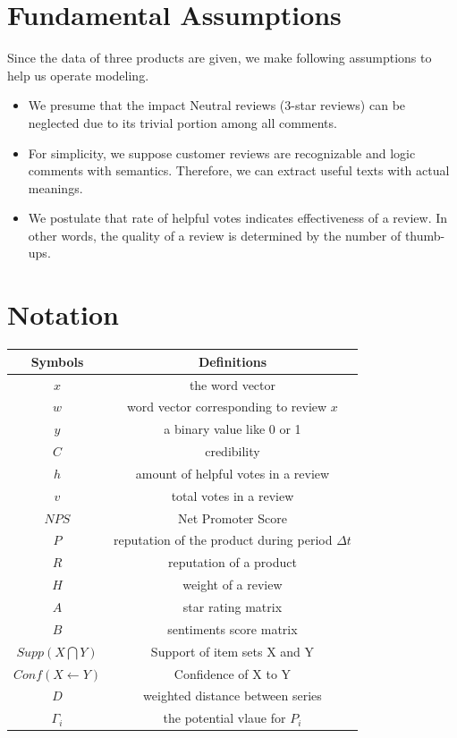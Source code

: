 \documentclass[12pt]{article}%
\begin{document}
\section{Fundamental Assumptions}
Since the data of three products are given, we make following assumptions to help us operate modeling.
\begin{itemize}
	
	\item We presume that the impact Neutral reviews (3-star reviews) can be neglected due to its trivial portion among all comments.
	\item For simplicity, we suppose customer reviews are recognizable and logic comments with semantics. Therefore, we can extract useful texts with actual meanings.
	\item We postulate that rate of helpful votes indicates effectiveness of a review. In other words, the quality of a review is determined by the number of thumb-ups.
\end{itemize}


\section{Notation}

\begin{table}[H]
	\label{biao} \centering
	\begin{tabular}{cc}
		\toprule[1.5pt]
		\multicolumn{1}{m{3cm}}{\centering Symbols} & \multicolumn{1}{m{10cm}}{\centering Definitions} \\
		\midrule[1pt]
		$x$	 &  the word vector\\
		$w$	 &  word vector corresponding to review $x$\\
		$y$	 &  a binary value like 0 or 1\\
		$C$	 &  credibility\\
		$h$	 &  amount of helpful votes in a review\\
		$v$	 &  total votes in a review\\
		$NPS$	 &  Net Promoter Score\\
		$P$	 &  reputation of the product during period $\Delta t$\\
		$R$	 &  reputation of a product\\
		$H$	 & weight of a review\\
		$A$	 &  star rating matrix\\
		$B$	 &  sentiments score matrix\\
		$Supp(X\bigcap Y)$	 & Support of item sets X and Y \\
		$Conf(X\leftarrow Y)$	 &  Confidence of X to Y\\
		$D$	 &  weighted distance between series\\
		$\Gamma_{i}$	 &  the potential vlaue for $P_i$\\
		\bottomrule[1.5pt]
	\end{tabular}
\end{table}
\end{document}

